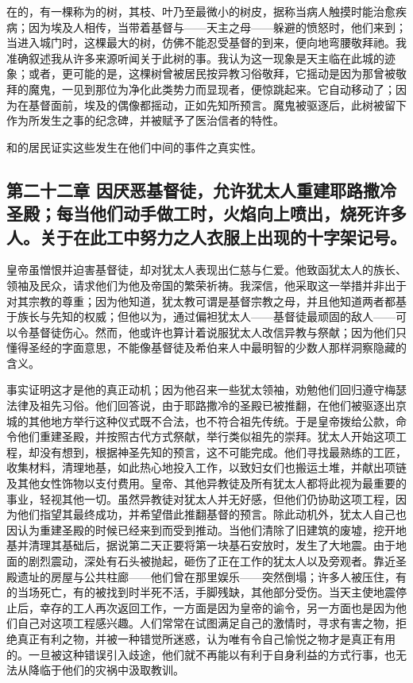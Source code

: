在的，有一棵称为的树，其枝、叶乃至最微小的树皮，据称当病人触摸时能治愈疾病；因为埃及人相传，当带着基督与——天主之母——躲避的愤怒时，他们来到；当进入城门时，这棵最大的树，仿佛不能忍受基督的到来，便向地弯腰敬拜祂。我准确叙述我从许多来源听闻关于此树的事。我认为这一现象是天主临在此城的迹象；或者，更可能的是，这棵树曾被居民按异教习俗敬拜，它摇动是因为那曾被敬拜的魔鬼，一见到那位为净化此类势力而显现者，便惊跳起来。它自动移动了；因为在基督面前，埃及的偶像都摇动，正如先知所预言。魔鬼被驱逐后，此树被留下作为所发生之事的纪念碑，并被赋予了医治信者的特性。\par

和的居民证实这些发生在他们中间的事件之真实性。\par


\subsection{第二十二章 因厌恶基督徒，允许犹太人重建耶路撒冷圣殿；每当他们动手做工时，火焰向上喷出，烧死许多人。关于在此工中努力之人衣服上出现的十字架记号。}

皇帝虽憎恨并迫害基督徒，却对犹太人表现出仁慈与仁爱。他致函犹太人的族长、领袖及民众，请求他们为他及帝国的繁荣祈祷。我深信，他采取这一举措并非出于对其宗教的尊重；因为他知道，犹太教可谓是基督宗教之母，并且他知道两者都基于族长与先知的权威；但他以为，通过偏袒犹太人——基督徒最顽固的敌人——可以令基督徒伤心。然而，他或许也算计着说服犹太人改信异教与祭献；因为他们只懂得圣经的字面意思，不能像基督徒及希伯来人中最明智的少数人那样洞察隐藏的含义。\par

事实证明这才是他的真正动机；因为他召来一些犹太领袖，劝勉他们回归遵守梅瑟法律及祖先习俗。他们回答说，由于耶路撒冷的圣殿已被推翻，在他们被驱逐出京城的其他地方举行这种仪式既不合法，也不符合祖先传统。于是皇帝拨给公款，命令他们重建圣殿，并按照古代方式祭献，举行类似祖先的崇拜。犹太人开始这项工程，却没有想到，根据神圣先知的预言，这不可能完成。他们寻找最熟练的工匠，收集材料，清理地基，如此热心地投入工作，以致妇女们也搬运土堆，并献出项链及其他女性饰物以支付费用。皇帝、其他异教徒及所有犹太人都将此视为最重要的事业，轻视其他一切。虽然异教徒对犹太人并无好感，但他们仍协助这项工程，因为他们指望其最终成功，并希望借此推翻基督的预言。除此动机外，犹太人自己也因认为重建圣殿的时候已经来到而受到推动。当他们清除了旧建筑的废墟，挖开地基并清理其基础后，据说第二天正要将第一块基石安放时，发生了大地震。由于地面的剧烈震动，深处有石头被抛起，砸伤了正在工作的犹太人以及旁观者。靠近圣殿遗址的房屋与公共柱廊——他们曾在那里娱乐——突然倒塌；许多人被压住，有的当场死亡，有的被找到时半死不活，手脚残缺，其他部分受伤。当天主使地震停止后，幸存的工人再次返回工作，一方面是因为皇帝的谕令，另一方面也是因为他们自己对这项工程感兴趣。人们常常在试图满足自己的激情时，寻求有害之物，拒绝真正有利之物，并被一种错觉所迷惑，认为唯有令自己愉悦之物才是真正有用的。一旦被这种错误引入歧途，他们就不再能以有利于自身利益的方式行事，也无法从降临于他们的灾祸中汲取教训。\par


